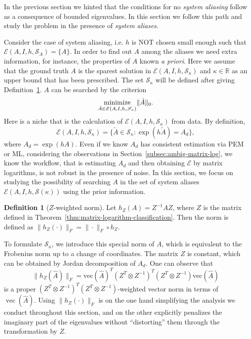 \documentclass[letterpaper,10pt,journal,final]{IEEEtran}
\theoremstyle{definition}
\newtheorem{definition}[theorem]{Definition}
\theoremstyle{remark}
\newcommand{\kvec}{\operatorname{vec}}
\newcommand{\minimize}[1]{\underset{#1}{\operatorname{minimize}}}  \newcommand{\st}{\operatorname{subject\ to}}
\begin{document}
In the previous section we hinted that the conditions for no \emph{system aliasing}
follow as a consequence of bounded eigenvalues.  In this section we follow this path
and study the problem in the presence of \emph{system aliases}.


Consider the case of system aliasing, i.e. $h$ is NOT chosen small enough such that
$\mathscr{E}(A, I, h, \mathscr{S}_A) = \{A\}$. In order to find out $A$ among the
aliases we need extra information, for instance, the properties of $A$ known \emph{a
  priori}. Here we assume that the ground truth $A$ is the sparest solution in
$\mathscr{E}(A, I, h, \mathscr{S}_\kappa)$ and $\kappa \in \mathbb{R}$ as an upper
bound that has been prescribed. The set $\mathscr{S}_\kappa$ will be defined after
giving Definition~\ref{def:coord-change-norm}.  $A$ can be searched by the criterion
\begin{equation}
  \label{eq:sparsity-multiple-logm-bounded}
  \minimize{\hat{A} \in \mathscr{E}(A, I, h, \mathscr{S}_\kappa)}  \|\hat{A}\|_0.
  \vspace*{-1.5mm}
\end{equation}
Here is a niche that is the calculation of $\mathscr{E}(A,I,h,\mathscr{S}_\kappa)$
from data.
By definition,
\begin{equation}
  \label{eq:def-set-S}
  \mathscr{E}(A, I, h, \mathscr{S}_\kappa) = \big\{\tilde{A} \in \mathscr{S}_\kappa: \exp(h \tilde{A}) = A_d \big\},
\end{equation}
where $A_d = \exp(hA)$.
Even if we know $A_d$ has consistent estimation via PEM or ML, considering
the observations in Section~\ref{subsec:ambig-matrix-log}, we know the workflow,
that is estimating $A_d$ and then obtaining $\mathscr{E}$ by matrix logarithms, is not
robust in the presence of noise.  In this section, we focus on studying the
possibility of searching $A$ in the set of system aliases
$\mathscr{E}(A,I,h,\mathscr{S}(\kappa))$ using the prior information.

\begin{definition}[$Z$-weighted norm]
  \label{def:coord-change-norm}
  Let $h_Z(A) = Z^{-1}AZ$,
  where $Z$ is the matrix defined in Theorem~\ref{thm:matrix-logarithm-classification}.
  Then the norm is defined as $ \|h_Z(\cdot)\|_F = \|\cdot\|_F \circ h_Z$.
\end{definition}
To formulate $\mathscr{S}_\kappa$, we introduce this special norm of ${A}$, which is equivalent to the Frobenius norm up to a change of coordinates.
The matrix $Z$ is constant, which can be obtained by Jordan decomposition of
$A_d$. One can observe that
\begin{equation*}
  \|h_Z(\hat{A})\|_F = \text{vec}(\hat{A})^T(Z^T \otimes Z^{-1})^T(Z^T \otimes Z^{-1})\text{vec}(\hat{A})
\end{equation*}
is a proper $(Z^T \otimes Z^{-1})^T(Z^T \otimes Z^{-1})$-weighted vector norm in
terms of $\kvec(\hat{A})$.  Using $\| h_Z(\cdot) \|_F$ is on the one hand simplifying
the analysis we conduct throughout this section, and on the other explicitly
penalizes the imaginary part of the eigenvalues without ``distorting'' them through
the transformation by $Z$.
\end{document}

